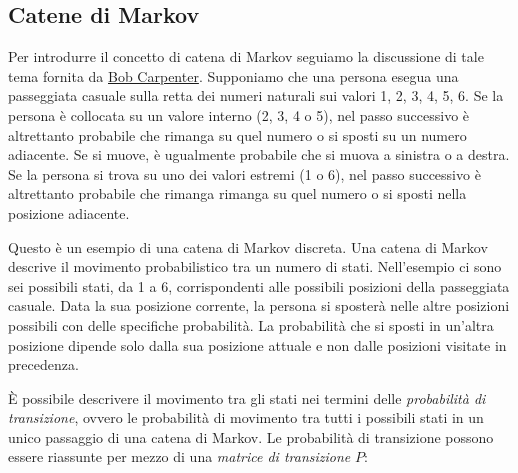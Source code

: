 \documentclass[
]{memoir}
\begin{document}
\hypertarget{catene-di-markov}{%
\subsection{Catene di Markov}\label{catene-di-markov}}

Per introdurre il concetto di catena di Markov seguiamo la discussione di tale tema fornita da \href{https://github.com/bob-carpenter/prob-stats}{Bob Carpenter}. Supponiamo che una persona esegua una passeggiata casuale sulla retta dei numeri naturali sui valori 1, 2, 3, 4, 5, 6. Se la persona è collocata su un valore interno (2, 3, 4 o 5), nel passo successivo è altrettanto probabile che rimanga su quel numero o si sposti su un numero adiacente. Se si muove, è ugualmente probabile che si muova a sinistra o a destra. Se la persona si trova su uno dei valori estremi (1 o 6), nel passo successivo è altrettanto probabile che rimanga rimanga su quel numero o si sposti nella posizione adiacente.

Questo è un esempio di una catena di Markov discreta. Una catena di Markov descrive il movimento probabilistico tra un numero di stati. Nell'esempio ci sono sei possibili stati, da 1 a 6, corrispondenti alle possibili posizioni della passeggiata casuale. Data la sua posizione corrente, la persona si sposterà nelle altre posizioni possibili con delle specifiche probabilità. La probabilità che si sposti in un'altra posizione dipende solo dalla sua posizione attuale e non dalle posizioni visitate in precedenza.

È possibile descrivere il movimento tra gli stati nei termini delle \emph{probabilità di transizione}, ovvero le probabilità di movimento tra tutti i possibili stati in un unico passaggio di una catena di Markov. Le probabilità di transizione possono essere riassunte per mezzo di una \emph{matrice di transizione} \(P\):
\end{document}
